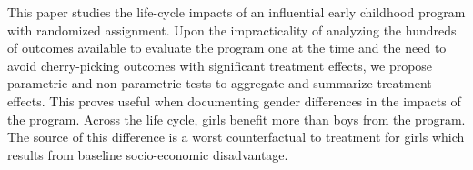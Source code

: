 \noindent This paper studies the life-cycle impacts of an influential early childhood program with randomized assignment. Upon the impracticality of analyzing the hundreds of outcomes available to evaluate the program one at the time and the need to avoid cherry-picking outcomes with significant treatment effects, we propose parametric and non-parametric tests to aggregate and summarize treatment effects. This proves useful when documenting gender differences in the impacts of the program. Across the life cycle, girls benefit more than boys from the program. The source of this difference is a worst counterfactual to treatment for girls which results from baseline socio-economic disadvantage.